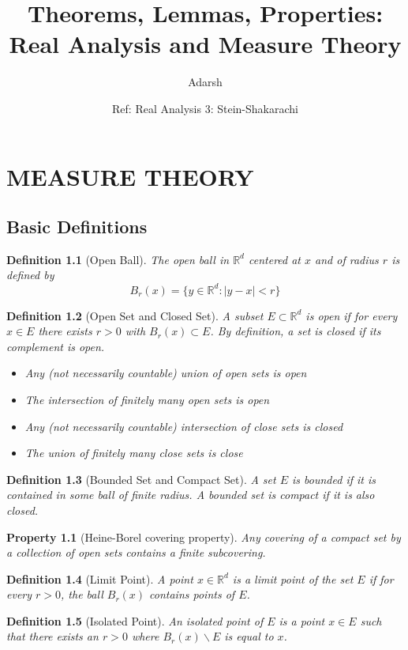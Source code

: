 \documentclass{report}
\title{Theorems, Lemmas, Properties: Real Analysis and Measure Theory}
\author{Adarsh}
\date{Ref: Real Analysis 3: Stein-Shakarachi}
\newtheorem{defn}{Definition}
\newtheorem{property}{Property}
\newcommand{\reals}{\mathbb{R}}
\newcommand{\set}[1]{\big\lbrace #1 \big\rbrace}
\begin{document}
\maketitle

\chapter{MEASURE THEORY}
\section{Basic Definitions}
\begin{defn}[Open Ball]
	The open ball in $\reals^d$ centered at $x$ and of radius $r$ is defined by
	$$B_r(x) = \set{y \in \reals^d : | y - x | < r}$$
\end{defn}
\begin{defn}[Open Set and Closed Set]
	A subset $E \subset \reals^d$ is open if for every $x \in E$ there exists $r > 0$ with
	$B_r(x) \subset E$. By definition, a set is closed if its complement is open. 
	\begin{itemize}
		\item Any (not necessarily countable) union of open sets is open
		\item The intersection of finitely many open sets is open
		\item Any (not necessarily countable) intersection of close sets is closed
		\item The union of finitely many close sets is close
	\end{itemize}
\end{defn}
\begin{defn}[Bounded Set and Compact Set]
	A set $E$ is bounded if it is contained in some ball of finite radius.	A bounded set is compact if it is also closed.
\end{defn}
\begin{property}[Heine-Borel covering property]
	Any covering of a compact set by a collection of open sets contains a finite subcovering.
\end{property}
\begin{defn}[Limit Point]
	A point $x \in \reals^d$ is a limit point of the set $E$ if for every $r > 0$, the ball
	$B_r(x)$ contains points of $E$.
\end{defn}
\begin{defn}[Isolated Point]
	An isolated point of $E$ is a point $x \in E$ such that there exists an $r > 0$ where $B_r(x) \backslash E$ is equal to $x$.
\end{defn}
\end{document}
